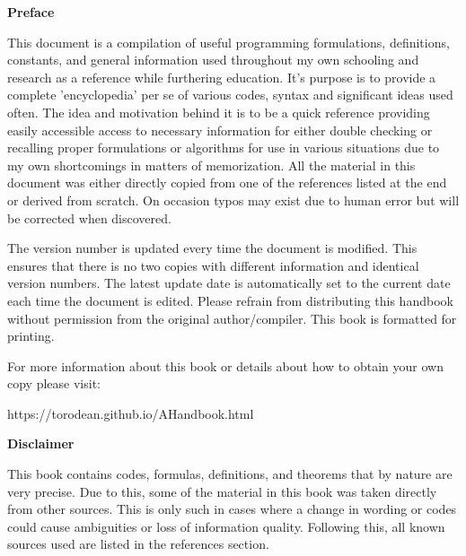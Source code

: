 \begin{center}
	\textbf{Preface}
\end{center}

This document is a compilation of useful programming formulations, definitions, constants, and general information used throughout my own schooling and research as a reference while furthering education. It's purpose is to provide a complete 'encyclopedia' per se of various codes, syntax and significant ideas used often. The idea and motivation behind it is to be a quick reference providing easily accessible access to necessary information for either double checking or recalling proper formulations or algorithms for use in various situations due to my own shortcomings in matters of memorization. All the material in this document was either directly copied from one of the references listed at the end or derived from scratch. On occasion typos may exist due to human error but will be corrected when discovered.
	
The version number is updated every time the document is modified. This ensures that there is no two copies with different information and identical version numbers. The latest update date is automatically set to the current date each time the document is edited. Please refrain from distributing this handbook without permission from the original author/compiler. This book is formatted for printing.

For more information about this book or details about how to obtain your own copy please visit:
\begin{center}
	https://torodean.github.io/AHandbook.html
\end{center}
\begin{center}
	\textbf{Disclaimer}
\end{center}

This book contains codes, formulas, definitions, and theorems that by nature are very precise. Due to this, some of the material in this book was taken directly from other sources. This is only such in cases where a change in wording or codes could cause ambiguities or loss of information quality.  Following this, all known sources used are listed in the references section.